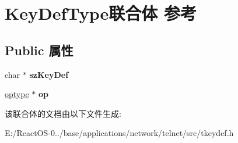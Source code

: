 \hypertarget{union_key_def_type}{}\section{Key\+Def\+Type联合体 参考}
\label{union_key_def_type}
\subsection*{Public 属性}
\begin{DoxyCompactItemize}
\item 
\mbox{\label{union_key_def_type_a5862ad7a88db6d3aeb1cf92d61ae8393}} 
char $\ast$ {\bfseries sz\+Key\+Def}
\item 
\mbox{\label{union_key_def_type_aff5cd6a2b3a322bf2ac18f3a656ceb31}} 
\hyperlink{structoptype}{optype} $\ast$ {\bfseries op}
\end{DoxyCompactItemize}


该联合体的文档由以下文件生成\+:\begin{DoxyCompactItemize}
\item 
E\+:/\+React\+O\+S-\/0../base/applications/network/telnet/src/tkeydef.\+h\end{DoxyCompactItemize}

